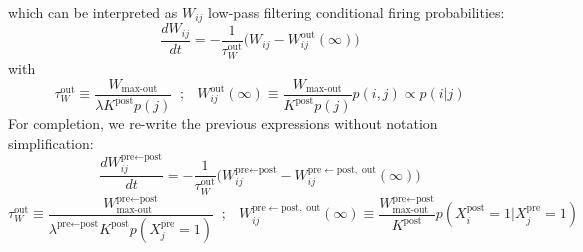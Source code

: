 \documentclass{article}
\begin{document}
\newline\newline
which can be interpreted as $W_{ij}$ low-pass filtering conditional firing probabilities:
 \begin{equation}
     \frac{dW_{ij}}{dt} = -\frac{1}{\tau_W^\textrm{out}}\Big(W_{ij}  - W_{ij}^\textrm{out}(\infty)\Big)
 \end{equation}
 with
 \begin{equation}
     \tau^\textrm{out}_W \equiv  \frac{W_\textrm{max-out}}{\lambda K^\textrm{post}p(j)}  \;\; ; \;\;\  W_{ij}^\textrm{out}(\infty) \equiv \frac{W_\textrm{max-out}}{K^\textrm{post}p(j)}p(i, j) \propto p(i|j)
 \end{equation}
\newline\newline
For completion, we re-write the previous expressions without notation simplification:
 \begin{equation}
     \frac{dW_{ij}^{\textrm{pre}\leftarrow\textrm{post}}}{dt} = -\frac{1}{\tau_W^\textrm{out}}\Big(W_{ij}^{\textrm{pre}\leftarrow\textrm{post}}  - W_{ij}^{\textrm{pre}\leftarrow\textrm{post} ,\; \textrm{out}}(\infty)\Big)
 \end{equation}
  \begin{equation}
     \tau^\textrm{out}_W \equiv  \frac{W_\textrm{max-out}^{\textrm{pre}\leftarrow\textrm{post}}}{\lambda^{\textrm{pre}\leftarrow\textrm{post}} K^\textrm{post}p(X_j^\textrm{pre} = 1)}  \;\; ; \;\;\  W_{ij}^{\textrm{pre}\leftarrow\textrm{post}, \; \textrm{out}}(\infty) \equiv \frac{W_\textrm{max-out}^{\textrm{pre}\leftarrow\textrm{post}}}{K^\textrm{post}}p(X^\textrm{post}_i = 1| X^\textrm{pre}_j = 1)
 \end{equation}
 

\end{document}
